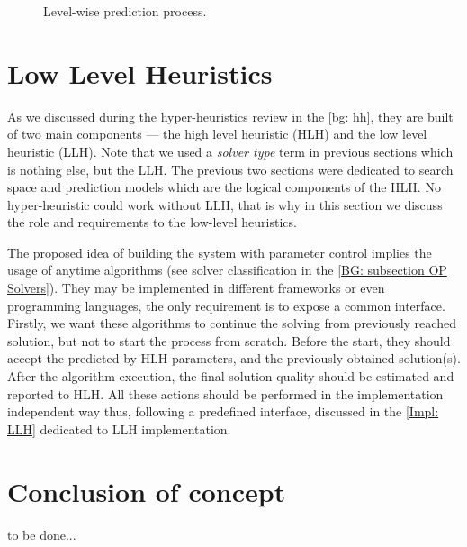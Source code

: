 \begin{figure}
	\centering
	
	\caption{Level-wise prediction process.}
	\label{concept:pict:Level-wise prediction process}
\end{figure}


\section{Low Level Heuristics}\label{concept: llh}
As we discussed during the hyper-heuristics review in the \cref{bg: hh}, they are built of two main components — the high level heuristic (HLH) and the low level heuristic (LLH). Note that we used a \emph{solver type} term in previous sections which is nothing else, but the LLH. The previous two sections were dedicated to search space and prediction models which are the logical components of the HLH. No hyper-heuristic could work without LLH, that is why in this section we discuss the role and requirements to the low-level heuristics.

The proposed idea of building the system with parameter control implies the usage of anytime algorithms (see solver classification in the \cref{BG: subsection OP Solvers}).
They may be implemented in different frameworks or even programming languages, the only requirement is to expose a common interface. Firstly, we want these algorithms to continue the solving from previously reached solution, but not to start the process from scratch. Before the start, they should accept the predicted by HLH parameters, and the previously obtained solution(s). After the algorithm execution, the final solution quality should be estimated and reported to HLH. All these actions should be performed in the implementation independent way thus, following a predefined interface, discussed in the \cref{Impl: LLH} dedicated to LLH implementation.


\section{Conclusion of concept}
to be done...